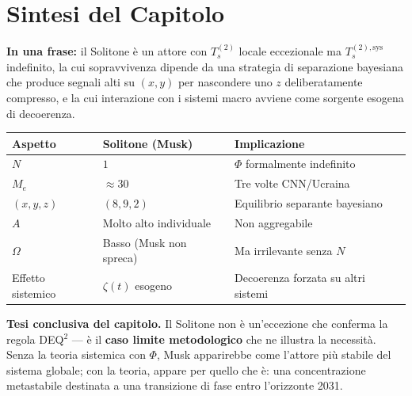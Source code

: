 \section{Sintesi del Capitolo}\label{sintesi-del-capitolo}

\Proved{} \textbf{In una frase:} il Solitone è un attore con
\(T_s^{(2)}\) locale eccezionale ma \(T_s^{(2),\text{sys}}\) indefinito,
la cui sopravvivenza dipende da una strategia di separazione bayesiana
che produce segnali alti su \((x, y)\) per nascondere uno \(z\)
deliberatamente compresso, e la cui interazione con i sistemi macro
avviene come sorgente esogena di decoerenza.

{\def\LTcaptype{none} %
{\small\begin{longtable}[]{@{}
  >{\raggedright\arraybackslash}p{}
  >{\raggedright\arraybackslash}p{}
  >{\raggedright\arraybackslash}p{}@{}}
\toprule\noalign{}
\begin{minipage}[b]{\linewidth}\raggedright
Aspetto
\end{minipage} & \begin{minipage}[b]{\linewidth}\raggedright
Solitone (Musk)
\end{minipage} & \begin{minipage}[b]{\linewidth}\raggedright
Implicazione
\end{minipage} \\
\midrule\noalign{}
\endhead
\bottomrule\noalign{}
\endlastfoot
\(N\) & \(1\) & \(\Phi\) formalmente indefinito \\
\(M_e\) & \(\approx 30\) & Tre volte CNN/Ucraina \\
\((x, y, z)\) & \((8, 9, 2)\) & Equilibrio separante bayesiano \\
\(A\) & Molto alto individuale & Non aggregabile \\
\(\Omega\) & Basso (Musk non spreca) & Ma irrilevante senza \(N\) \\
Effetto sistemico & \(\zeta(t)\) esogeno & Decoerenza forzata su altri
sistemi \\
\end{longtable}}
}

\Hypoth{} \textbf{Tesi conclusiva del capitolo.} Il Solitone non è
un'eccezione che conferma la regola DEQ$^2$ --- è il \textbf{caso limite
metodologico} che ne illustra la necessità. Senza la teoria sistemica
con \(\Phi\), Musk apparirebbe come l'attore più stabile del sistema
globale; con la teoria, appare per quello che è: una concentrazione
metastabile destinata a una transizione di fase entro l'orizzonte 2031.



